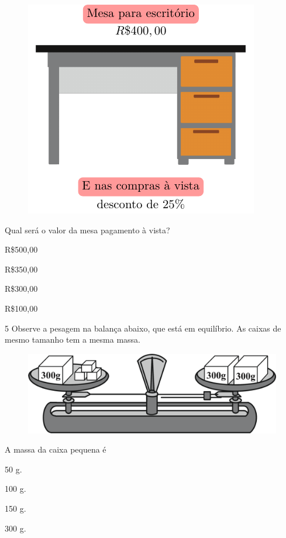 \begin{figure}[htpb!]
\centering
\includegraphics[width=.5\textwidth]{./tikz/047.pdf}
\end{figure}


Qual será o valor da mesa pagamento à vista?

\begin{escolha}

\item R\$500,00

\item R\$350,00

\item R\$300,00

\item R\$100,00

\end{escolha}

\num{5} Observe a pesagem na balança abaixo, que está em equilíbrio. As
caixas de mesmo tamanho tem a mesma massa.

\begin{figure}[htpb!]
\centering
\includegraphics[width=.5\textwidth]{./ilustras-mat/Simulado_3-atividade_5.png}
\end{figure}

A massa da caixa pequena é

\begin{escolha}

  \item 50 g. 

  \item 100 g. 

  \item 150 g. 

  \item 300 g.

\end{escolha}

